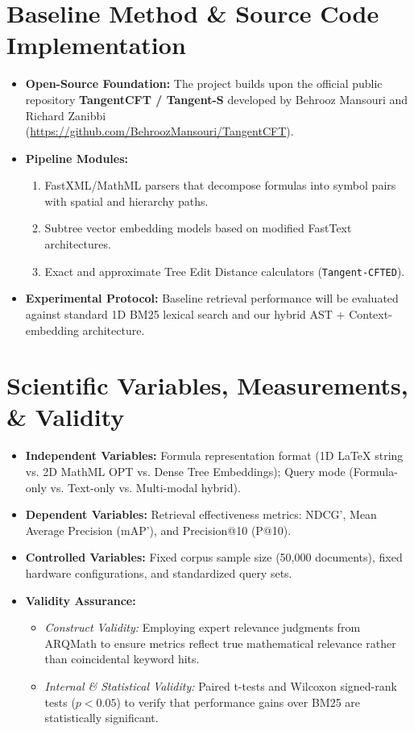\documentclass[11pt,a4paper]{article}
\begin{document}
\section{Baseline Method \& Source Code Implementation}
\begin{itemize}
	\item \textbf{Open-Source Foundation:} The project builds upon the official public repository \textbf{TangentCFT / Tangent-S} developed by Behrooz Mansouri and Richard Zanibbi\\ (\url{https://github.com/BehroozMansouri/TangentCFT}).
	\item \textbf{Pipeline Modules:}
	\begin{enumerate}
		\item FastXML/MathML parsers that decompose formulas into symbol pairs with spatial and hierarchy paths.
		\item Subtree vector embedding models based on modified FastText architectures.
		\item Exact and approximate Tree Edit Distance calculators (\texttt{Tangent-CFTED}).
	\end{enumerate}
	\item \textbf{Experimental Protocol:} Baseline retrieval performance will be evaluated against standard 1D BM25 lexical search and our hybrid AST + Context-embedding architecture.
\end{itemize}

\section{Scientific Variables, Measurements, \& Validity}

\begin{itemize}
	\item \textbf{Independent Variables:} Formula representation format (1D \LaTeX{} string vs. 2D MathML OPT vs. Dense Tree Embeddings); Query mode (Formula-only vs. Text-only vs. Multi-modal hybrid).
	\item \textbf{Dependent Variables:} Retrieval effectiveness metrics: NDCG', Mean Average Precision (mAP'), and Precision@10 (P@10).
	\item \textbf{Controlled Variables:} Fixed corpus sample size (50,000 documents), fixed hardware configurations, and standardized query sets.
	\item \textbf{Validity Assurance:}
	\begin{itemize}
		\item \textit{Construct Validity:} Employing expert relevance judgments from ARQMath to ensure metrics reflect true mathematical relevance rather than coincidental keyword hits.
		\item \textit{Internal \& Statistical Validity:} Paired t-tests and Wilcoxon signed-rank tests ($p < 0.05$) to verify that performance gains over BM25 are statistically significant.
	\end{itemize}
\end{itemize}
\end{document}
